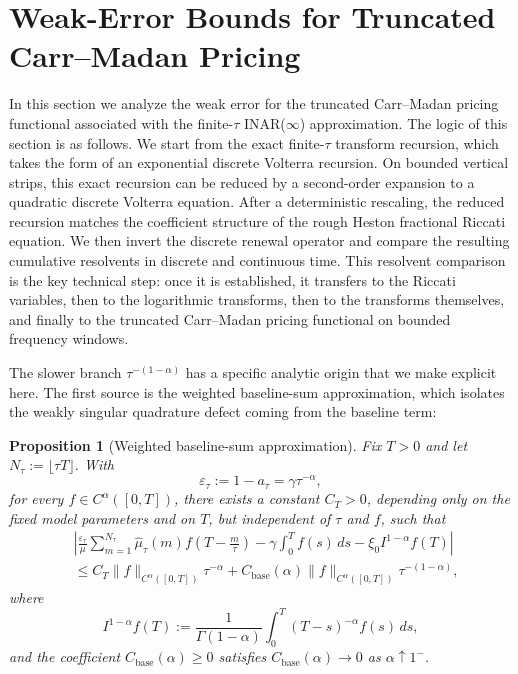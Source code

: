 \documentclass[letterpaper]{article}
\numberwithin{equation}{section}
\newtheorem{proposition}[theorem]{Proposition}
\theoremstyle{definition}
\theoremstyle{remark}
\begin{document}

\section{Weak-Error Bounds for Truncated Carr--Madan Pricing}\label{sec:weak-euro}

In this section we analyze the weak error for the truncated Carr--Madan pricing functional associated with the finite-$\tau$ INAR($\infty$) approximation. The logic of this section is as follows. We start from the exact finite-$\tau$ transform recursion, which takes the form of an exponential discrete Volterra recursion. On bounded vertical strips, this exact recursion can be reduced by a second-order expansion to a quadratic discrete Volterra equation. After a deterministic rescaling, the reduced recursion matches the coefficient structure of the rough Heston fractional Riccati equation. We then invert the discrete renewal operator and compare the resulting cumulative resolvents in discrete and continuous time. This resolvent comparison is the key technical step: once it is established, it transfers to the Riccati variables, then to the logarithmic transforms, then to the transforms themselves, and finally to the truncated Carr--Madan pricing functional on bounded frequency windows.

The slower branch $\tau^{-(1-\alpha)}$ has a specific analytic origin that we make explicit here. The first source is the weighted baseline-sum approximation, which isolates the weakly singular quadrature defect coming from the baseline term:

\begin{proposition}[Weighted baseline-sum approximation]\label{prop:baseline-riemann}
Fix $T>0$ and let $N_\tau:=\lfloor\tau T\rfloor$. With
\[
  \varepsilon_\tau:=1-a_\tau=\gamma\tau^{-\alpha},
\]
for every $f\in C^\alpha([0,T])$, there exists a constant $C_T>0$, depending
only on the fixed model parameters and on $T$, but independent of $\tau$ and
$f$, such that
\begin{equation}\label{eq:baseline-riemann}
\begin{aligned}
  &\left|
    \frac{\varepsilon_\tau}{\mu}
    \sum_{m=1}^{N_\tau}\hat\mu_\tau(m)f\!\left(T-\frac{m}{\tau}\right)
    -
    \gamma\int_0^T f(s)\,ds
    -
    \xi_0 I^{1-\alpha}f(T)
  \right|
  \\
  &\le
  C_T\|f\|_{C^\alpha([0,T])}\tau^{-\alpha}
  +
  C_{\mathrm{base}}(\alpha)\|f\|_{C^\alpha([0,T])}\tau^{-(1-\alpha)},
\end{aligned}
\end{equation}
where
\[
  I^{1-\alpha}f(T)
  :=
  \frac{1}{\Gamma(1-\alpha)}
  \int_0^T(T-s)^{-\alpha}f(s)\,ds,
\]
and the coefficient $C_{\mathrm{base}}(\alpha)\ge0$ satisfies
$C_{\mathrm{base}}(\alpha)\to0$ as $\alpha\uparrow1^-$.
\end{proposition}
\end{document}
